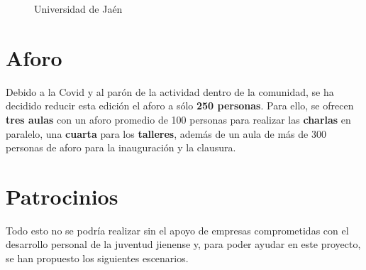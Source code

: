 \documentclass[12pt]{article}
\begin{document}
\begin{figure}[h]
 \centering
 \caption{Universidad de Jaén}
 \label{f:animales}
\end{figure}

\section{Aforo}
 Debido a la Covid y al parón de la actividad dentro de la comunidad, se ha decidido reducir esta edición el aforo a sólo \textbf{250 personas}. Para ello, se ofrecen \textbf{tres aulas} con un aforo promedio de 100 personas para realizar las \textbf{charlas} en paralelo, una \textbf{cuarta} para los \textbf{talleres}, además de un aula de más de 300 personas de aforo para la inauguración y la clausura. 

\section{Patrocinios}

 Todo esto no se podría realizar sin el apoyo de empresas comprometidas con el desarrollo personal de la juventud jienense y, para poder ayudar en este proyecto, se han propuesto los siguientes escenarios.
 
\end{document}
